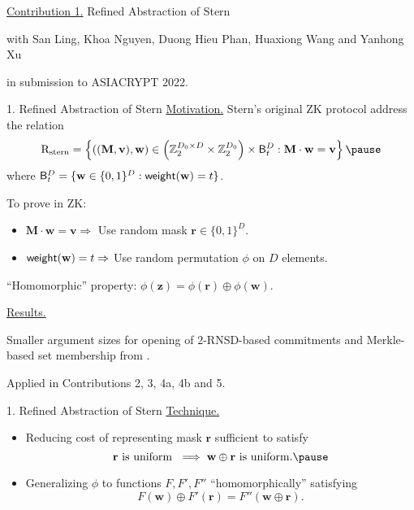 \begin{frame}{}
	\underline{Contribution 1.} Refined Abstraction of Stern
	
	{\small with San Ling, Khoa Nguyen, Duong Hieu Phan, Huaxiong Wang and Yanhong Xu}
	
	in submission to ASIACRYPT 2022.
\end{frame}

\begin{frame}{1. Refined Abstraction of Stern}
	\underline{Motivation.} Stern's original ZK protocol address the relation \pause
	\begin{equation*}
		\RelationStern = \left\{((\mathbf{M},\mathbf{v}), \mathbf{w}) \in \left(\mathbb{Z}_2^{D_0\times D}\times \mathbb{Z}_2^{D_0}\right)\times \FixedWeightSet^D_t : \mathbf{M}\cdot\mathbf{w} = \mathbf{v}\right\}\pause
	\end{equation*}
	where $\mathsf{B}^D_t = \{\mathbf{w} \in \{0,1\}^D : \mathsf{weight}(\mathbf{w}) = t\}$.\pause
	
	To prove in ZK:\pause
	\begin{itemize}
			\item $\mathbf{M}\cdot\mathbf{w} =\mathbf{v} \Rightarrow$ Use random mask $\mathbf{r} \in \{0,1\}^D$.\pause
			\item $\mathsf{weight}(\mathbf{w}) = t \Rightarrow$ Use random permutation $\phi$ on $D$ elements.\pause
	\end{itemize}
	
	``Homomorphic'' property: $\phi(\mathbf{z}) = \phi(\mathbf{r}) \oplus \phi(\mathbf{w})$.\pause
	
	\underline{Results.}\pause
	
	Smaller argument sizes for opening of $2$-RNSD-based commitments and Merkle-based set membership from \cite{NguyenTWZ19}.\pause
	
	Applied in Contributions 2, 3, 4a, 4b and 5.
\end{frame}

\begin{frame}{1. Refined Abstraction of Stern}
	\underline{Technique.}\pause
	\begin{itemize}
		\item Reducing cost of representing mask $\mathbf{r}$ sufficient to satisfy \pause
		\begin{equation*}
			\mathbf{r} \text{ is uniform } \implies \mathbf{w} \oplus \mathbf{r} \text{ is uniform.}\pause
		\end{equation*}  
		\item Generalizing $\phi$ to functions $F, F', F''$ ``homomorphically'' satisfying\pause
		\begin{equation*}
			F(\mathbf{w}) \oplus F'(\mathbf{r}) = F''(\mathbf{w} \oplus \mathbf{r}).
		\end{equation*}
	\end{itemize}
\end{frame}